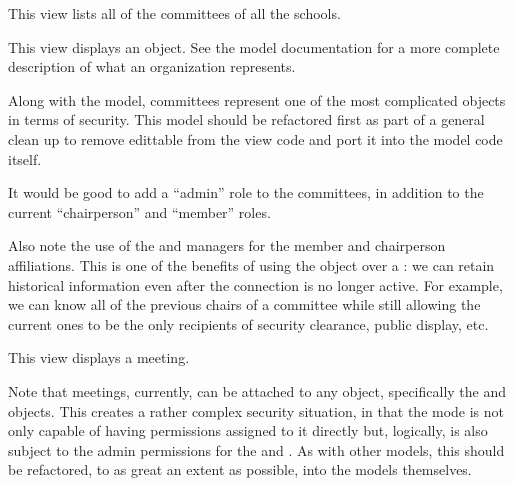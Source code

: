 \documentclass[letterpaper,10pt,english]{sphinxmanual}
\begin{document}

\begin{fulllineitems}
\label{generated/apps.reporting.views:apps.reporting.views.list_committees_by_school}
This view lists all of the committees of all the schools.

\end{fulllineitems}



\begin{fulllineitems}
\label{generated/apps.reporting.views:apps.reporting.views.view_committee}
This view displays an  object.  See the model documentation
for a more complete description of what an organization represents.

Along with the  model, committees represent one of the most
complicated objects in terms of security.  This model should be refactored first
as part of a general clean up to remove edittable from the view code and port
it into the model code itself.

It would be good to add a ``admin'' role to the committees, in
addition to the current ``chairperson'' and ``member'' roles.

Also note the use of the  and  managers for the member
and chairperson affiliations.  This is one of the benefits of using the 
 object over a : we can retain historical
information even after the connection is no longer active.  For example, 
we can know all of the previous chairs of a committee while still allowing 
the current ones to be the only recipients of security clearance, public display,
etc.

\end{fulllineitems}



\begin{fulllineitems}
\label{generated/apps.reporting.views:apps.reporting.views.view_meeting}
This view displays a meeting.

Note that meetings, currently, can be attached to any object, specifically the
 and  objects.  This creates a rather complex security
situation, in that the  mode is not only capable of having permissions 
assigned to it directly but, logically, is also subject to the admin permissions for
the  and .  As with other models, this should be 
refactored, to as great an extent as possible, into the models themselves.

\end{fulllineitems}
\end{document}
